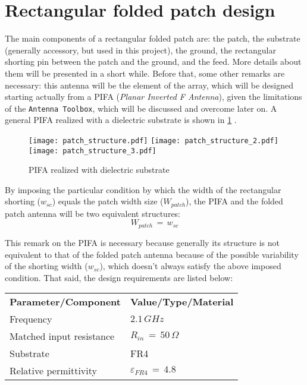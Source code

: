 \documentclass[12pt,a4paper]{article}
\begin{document}
{\newpage
\section*{Rectangular folded patch design}

The main components of a rectangular folded patch are: the patch, the substrate (generally accessory, but used in this project), the ground, the rectangular shorting pin between the patch and the ground, and the feed. More details about them will be presented in a short while. Before that, some other remarks are necessary: this antenna will be the element of the array, which will be designed starting actually from a PIFA (\emph{Planar Inverted F Antenna}), given the limitations of the \texttt{\color{Mahogany}Antenna Toolbox}, which will be discussed and overcome later on. A general PIFA realized with a dielectric substrate is shown in \cref{fig:patch_structure} .

\begin{figure}[h]
\begin{center}
\texttt{[image: patch\_structure.pdf]}
\texttt{[image: patch\_structure\_2.pdf]}
\texttt{[image: patch\_structure\_3.pdf]}
\end{center}
\caption{PIFA realized with dielectric substrate}
\label{fig:patch_structure}
\end{figure}
By imposing the particular condition by which the width of the rectangular shorting ($w_{sc}$) equals the patch width size ($W_{patch}$), the PIFA and the folded patch antenna will be two equivalent structures:
\begin{equation}
	W_{patch}\,=\,w_{sc}
\end{equation}

This remark on the PIFA is necessary because generally its structure is not equivalent to that of the folded patch antenna because of the possible variability of the shorting width ($w_{sc}$), which doesn't always satisfy the above imposed condition. That said, the design requirements are listed below: 
	\begin{table}[h]
		\begin{center}
			{\selectfont
\begin{tabular}{||m{5cm}|m{5cm}||}
\hline 
	\rowcolor{lightgray}\multicolumn{2}{|c|}{\textbf{Folded patch design parameters}} 
	\\
	\hline
	\cellcolor{mintbg}\textbf{Parameter/Component} & \cellcolor{mintbg}\textbf{Value/Type/Material}\\
	\hline
	Frequency & $2.1\,GHz$ \\
	\hline
	Matched input resistance & $R_{in}\,=\,50\,\Omega$\\
	\hline
	\cellcolor{pink} Substrate & \cellcolor{pink} FR4 \\
	\hline
    Relative permittivity & $\varepsilon_{FR4}\,=\,4.8$ \\


\end{tabular}}
\end{center}
\end{table}}
\end{document}
